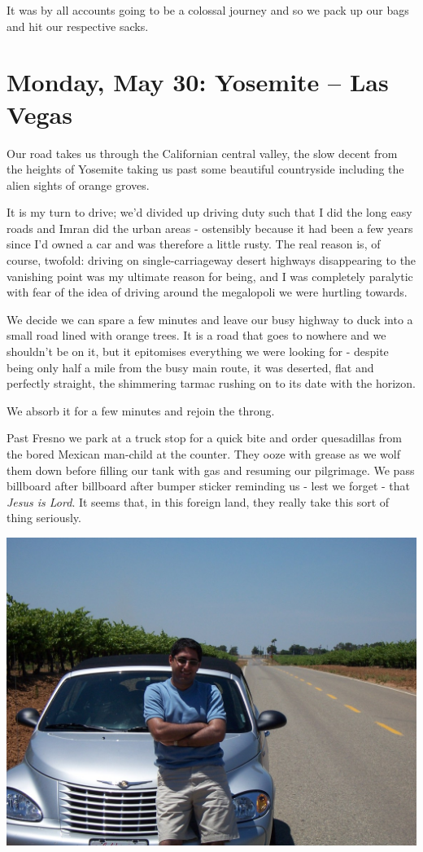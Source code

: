 \documentclass[a5paper,titlepage,11pt]{book}
\begin{document}
It was by all accounts going to be a colossal journey and so we pack up our bags and hit our respective sacks.

\chapter[Yosemite -- Las Vegas]{Monday, May 30: Yosemite -- Las Vegas}
Our road takes us through the Californian central valley, the slow decent from the heights of Yosemite taking us past some beautiful countryside including the alien sights of orange groves.

It is my turn to drive; we'd divided up driving duty such that I did the long easy roads and Imran did the urban areas - ostensibly because it had been a few years since I'd owned a car and was therefore a little rusty. The real reason is, of course, twofold: driving on single-carriageway desert highways disappearing to the vanishing point was my ultimate reason for being, and I was completely paralytic with fear of the idea of driving around the megalopoli we were hurtling towards.

We decide we can spare a few minutes and leave our busy highway to duck into a small road lined with orange trees. It is a road that goes to nowhere and we shouldn't be on it, but it epitomises everything we were looking for - despite being only half a mile from the busy main route, it was deserted, flat and perfectly straight, the shimmering tarmac rushing on to its date with the horizon.

We absorb it for a few minutes and rejoin the throng.

Past Fresno we park at a truck stop for a quick bite and order quesadillas from the bored Mexican man-child at the counter. They ooze with grease as we wolf them down before filling our tank with gas and resuming our pilgrimage. We pass billboard after billboard after bumper sticker reminding us - lest we forget - that \emph{Jesus is Lord}. It seems that, in this foreign land, they really take this sort of thing seriously.

\begin{center}\includegraphics[width=\textwidth]{gfx/100_1307}\end{center}
\end{document}
